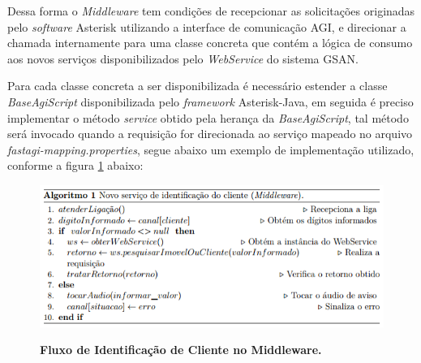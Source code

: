 Dessa forma o \textit{Middleware} tem condições de recepcionar as solicitações originadas pelo \textit{software} Asterisk utilizando a interface de comunicação AGI, e direcionar a chamada internamente para uma classe concreta que contém a lógica de consumo aos novos serviços disponibilizados pelo \textit{WebService} do sistema GSAN.

Para cada classe concreta a ser disponibilizada é necessário estender a classe \textit{BaseAgiScript} disponibilizada pelo \textit{framework} Asterisk-Java, em seguida é preciso implementar o método \textit{service} obtido pela herança da \textit{BaseAgiScript}, tal método será invocado quando a requisição for direcionada ao serviço mapeado no arquivo \textit{fastagi-mapping.properties}, segue abaixo um exemplo de implementação utilizado, conforme a figura \ref{figura:fluxoIdentificacaoCliente} abaixo:



\begin{figure}[H]
	\caption{\textbf{Fluxo de Identificação de Cliente no Middleware.}}	
	\label{figura:fluxoIdentificacaoCliente}
	\includegraphics{figuras/algoritmo_1.png}
	\\[6pt]
	\fontsize{10}{12}\selectfont {Fonte: Autoria Própria.}
\end{figure}

